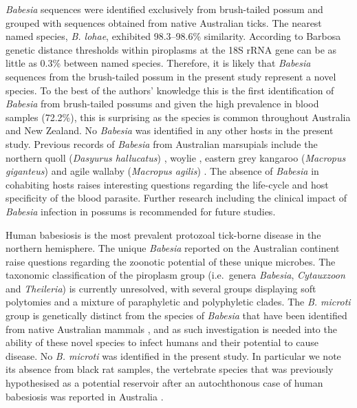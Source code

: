 \documentclass[a4paper, nobind]{templates/ociamthesis}
\begin{document}
\emph{Babesia} sequences were identified exclusively from brush-tailed possum and grouped with sequences obtained from native Australian ticks.
The nearest named species, \emph{B. lohae}, exhibited 98.3--98.6\% similarity.
According to Barbosa \autocite*{barbosaSequenceAnalysesMitochondrial2019} genetic distance thresholds within piroplasms at the 18S rRNA gene can be as little as 0.3\% between named species.
Therefore, it is likely that \emph{Babesia} sequences from the brush-tailed possum in the present study represent a novel species.
To the best of the authors' knowledge this is the first identification of \emph{Babesia} from brush-tailed possums and given the high prevalence in blood samples (72.2\%), this is surprising as the species is common throughout Australia and New Zealand.
No \emph{Babesia} was identified in any other hosts in the present study.
Previous records of \emph{Babesia} from Australian marsupials include the northern quoll (\emph{Dasyurus hallucatus}) \autocite{bangsBabesiaThylacisApicomplexa1996}, woylie \autocite{papariniIdentificationNovelBabesia2012,northoverIncreasedTrypanosomaSpp2019}, eastern grey kangaroo (\emph{Macropus giganteus}) and agile wallaby (\emph{Macropus agilis}) \autocite{donahoeRetrospectiveStudyBabesia2015}.
The absence of \emph{Babesia} in cohabiting hosts raises interesting questions regarding the life-cycle and host specificity of the blood parasite. Further research including the clinical impact of \emph{Babesia} infection in possums is recommended for future studies.

Human babesiosis is the most prevalent protozoal tick-borne disease in the northern hemisphere.
The unique \emph{Babesia} reported on the Australian continent raise questions regarding the zoonotic potential of these unique microbes.
The taxonomic classification of the piroplasm group (i.e.~genera \emph{Babesia}, \emph{Cytauxzoon} and \emph{Theileria}) \autocite{papariniFirstMolecularCharacterization2015,schreegMitochondrialGenomeSequences2016,barbosaSequenceAnalysesMitochondrial2019,jaloveckaBabesiaLifeCycle2019} is currently unresolved, with several groups displaying soft polytomies and a mixture of paraphyletic and polyphyletic clades.
The \emph{B. microti} group is genetically distinct from the species of \emph{Babesia} that have been identified from native Australian mammals \autocite{schreegMitochondrialGenomeSequences2016,barbosaSequenceAnalysesMitochondrial2019}, and as such investigation is needed into the ability of these novel species to infect humans and their potential to cause disease.
No \emph{B. microti} was identified in the present study.
In particular we note its absence from black rat samples, the vertebrate species that was previously hypothesised as a potential reservoir after an autochthonous case of human babesiosis was reported in Australia \autocite{senanayakeFirstReportHuman2012}.
\end{document}

